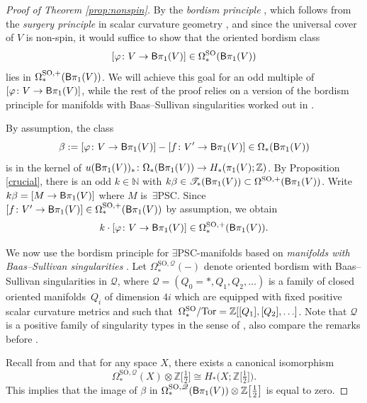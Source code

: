 \documentclass[10pt,a4paper]{amsart}
\numberwithin{equation}{section}
\newcommand{\Z}{\mathbb{Z}}
\newcommand{\N}{\mathbb{N}}
\newcommand{\SO}{\mathrm{SO}}
\newcommand{\sB}{{\sf B}}
\newcommand{\Tor}{{\rm Tor}}
\newcommand{\yes}{{\color {blue!70!black}$\exists$}{\sf PSC}}
\begin{document}
\begin{proof}[Proof of Theorem \ref{prop:nonspin}]
By the {\em bordism principle} \cite[Theorem 1.5]{R-S1995}, which follows from the {\em surgery principle} in scalar curvature geometry \cite{GL,SY}, and since the universal cover of $V$ is non-spin, it would suffice to show that the oriented bordism class
\[
 [ \varphi \colon V \to \sB \pi_1(V)] \in \Omega^{\SO}_*( \sB \pi_1(V))
\]
lies in $\Omega^{\SO, +}_*( \sB \pi_1(V))$.
We will achieve this goal for an odd multiple of $[ \varphi \colon V \to {\sf B} \pi_1(V)]$, while the rest of the proof relies on a version of the bordism principle for manifolds with Baas--Sullivan singularities worked out in \cite{Han20}.

By assumption, the class
\[
 \beta := [ \varphi \colon V \to \sB \pi_1(V) ] - [f \colon V' \to \sB \pi_1(V) ] \in \Omega_*( \sB \pi_1(V))
\]
is in the kernel of $u(\sB \pi_1 (V))_* \colon \Omega_*(\sB \pi_1(V)) \to H_*(\pi_1(V) ; \Z)$.
By Proposition \ref{crucial}, there is an odd $k \in \N$ with $k \beta \in \mathscr{T}_*(\sB \pi_1(V)) \subset \Omega^{\SO, +} ( \sB \pi_1(V)) $.
Write $k \beta = [ M \to \sB \pi_1(V)]$ where $M$ is~\yes.
Since $[f \colon V' \to \sB \pi_1(V) ] \in \Omega^{\SO,+}_*( \sB \pi_1(V))$ by assumption, we obtain
\[
 k\cdot [ \varphi \colon V \to \sB \pi_1(V) ] \in \Omega^{\SO, +}_*( \sB \pi_1(V)) .
\]

We now use the bordism principle for \yes-manifolds based on {\em manifolds with Baas--Sullivan singularities} \cite[Proposition 3.11]{Han20}.
Let $\Omega^{\SO, \mathscr{Q}}_*(-)$ denote oriented bordism with Baas--Sullivan singularities in $\mathscr{Q}$, where $\mathscr{Q} = (Q_0 = *, Q_1, Q_2, \ldots)$ is a family of closed oriented manifolds~$Q_i$ of dimension $4i$ which are equipped with fixed positive scalar curvature metrics and such that~${\Omega^{\SO}_* / \Tor = \Z [[Q_1], [Q_2], \ldots]}$.
Note that $\mathscr{Q}$ is a positive family of singularity types in the sense of \cite[Definition 3.2]{Han20}, also compare the remarks before \cite[Definition 3.12]{Han20}.

Recall from \cite{baas1} and \cite[Proposition 2.6]{Han20} that for any space $X$, there exists a canonical isomorphism
\[
 \Omega^{\SO, \mathscr{Q}}_*(X) \otimes \Z\big[\tfrac{1}{2}\big] \cong H_*\big(X; \Z\big[\tfrac{1}{2}\big] \big) .
 \]
This implies that the image of $\beta$ in $\Omega^{\SO, \mathscr{Q}}_*( \sB \pi_1(V)) \otimes \Z\big[\tfrac{1}{2}\big]$ is equal to zero.


\end{proof}
\end{document}

